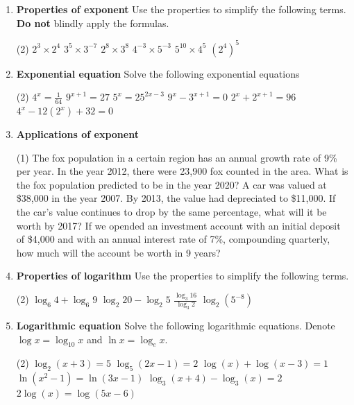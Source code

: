 \begin{enumerate}
\item \textbf{Properties of exponent} 
Use the properties to simplify the following terms. \textbf{Do not} blindly apply the formulas.
\begin{tasks}[after-item-skip = 30pt, after-skip = 30pt](2)
\task $2^3 \times 2^4$
\task $3^5 \times 3^{-7}$
\task $2^8 \times 3^8$
\task $4^{-3} \times 5^{-3}$
\task $5^{10} \times 4^{5}$
\task $(2^4)^5$
\end{tasks}

\item \textbf{Exponential equation} 
Solve the following exponential equations
\begin{tasks}[after-item-skip = 30pt, after-skip = 30pt](2)
\task $4^x = \frac{1}{64}$
\task $9^{x+1} = 27$
\task $5^{x} = 25^{2x-3}$
\task $9^{x} - 3^{x+1} = 0$
\task $2^{x} + 2^{x+1} = 96$
\task $4^x - 12 (2^x) + 32 = 0$ 
\end{tasks}

\item \textbf{Applications of exponent} 
\begin{tasks}[after-item-skip = 100pt, after-skip = 100pt](1)
\task The fox population in a certain region has an annual growth rate of 9\% per year. In the year 2012, there were 23,900 fox counted in the area. What is the fox population predicted to be in the year 2020?
\task A car was valued at \$38,000 in the year 2007. By 2013, the value had depreciated to \$11,000. If the car’s value continues to drop by the same percentage, what will it be worth by 2017?
\task If we opended an investment account with an initial deposit of \$4,000 and with an annual interest rate of 7\%, compounding quarterly, how much will the account be worth in 9 years? 
\end{tasks}

\newpage

\item \textbf{Properties of logarithm} 
Use the properties to simplify the following terms.
\begin{tasks}[after-item-skip = 40pt, after-skip = 40pt](2)
\task $\log_6 4 + \log_6 9$
\task $\log_2 20 - \log_2 5$
\task $\frac{\log_3 16}{\log_3 2}$
\task $\log_2 (5^{-8})$ 
\end{tasks}

\item \textbf{Logarithmic equation} 
Solve the following logarithmic equations. Denote $\log x = \log_{10} x$ and $\ln x = \log_{e} x$.
\begin{tasks}[after-item-skip = 50pt, after-skip = 50pt](2)
\task $\log_{2}(x+3) = 5$
\task $\log_{5}(2x-1) = 2$
\task $\log(x) + \log(x-3) = 1$
\task $\ln(x^2-1) = \ln(3x-1)$
\task $\log_{3}(x+4) - \log_{3}(x) = 2$
\task $2\log(x) = \log(5x-6)$
\end{tasks}


\end{enumerate}

